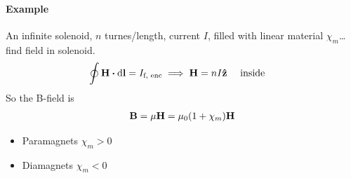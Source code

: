 \documentclass[../main.tex]{subfiles}
\begin{document}
\paragraph{Example} An infinite solenoid, $n$ turnes/length, current $I$, filled with linear material $\chi_m$\dots find field in solenoid.
\begin{align*}
    \oint \vb H \vdot \dd{\vb l} = I_\text{f, enc} \implies \vb H = n I \vu z \qqtext{ inside}
\end{align*}
So the B-field is
\begin{align*}
    \vb B = \mu \vb H = \mu_0 (1 + \chi_m) \vb H
\end{align*}
\begin{itemize}
    \item Paramagnets $\chi_m > 0$
    \item Diamagnets $\chi_m < 0$
\end{itemize}
\end{document}
